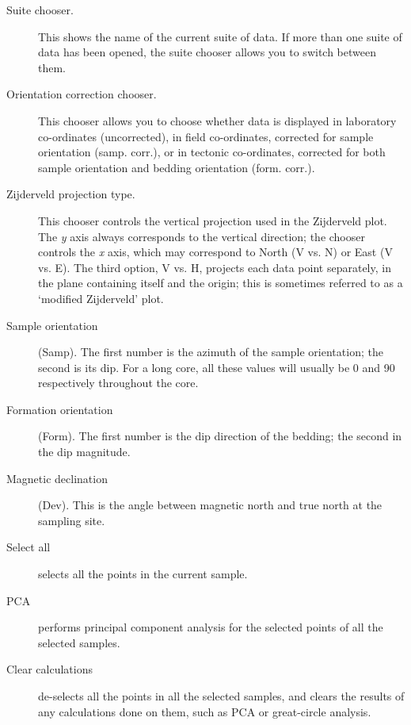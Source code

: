 \documentclass[a4paper,british]{article}
\newcommand{\ppcmd}[1]{\textsf{#1}} %
\newcommand{\caps}[1]{\MakeTextUppercase{#1}} %
\begin{document}
\begin{description}

\item[Suite chooser.] This shows the name of the current suite of
data. If more than one suite of data has been opened, the suite chooser
allows you to switch between them.

\item[Orientation correction chooser.] This chooser allows you to
choose whether data is displayed in laboratory co-ordinates
(\ppcmd{uncorrected}), in field co-ordinates, corrected for sample orientation
(\ppcmd{samp. corr.}), or in tectonic co-ordinates, corrected for both
sample orientation and bedding orientation (\ppcmd{form. corr.}).

\item[Zijderveld projection type.] This chooser controls the vertical
projection used in the Zijderveld plot. The {\em y} axis always corresponds
to the vertical direction; the chooser controls the {\em x} axis, which may
correspond to North (\ppcmd{V vs. N}) or East (\ppcmd{V vs. E}). The third
option, \ppcmd{V vs. H}, projects each data point separately, in the plane
containing itself and the origin; this is sometimes referred to as a
`modified Zijderveld' plot.

\item[Sample orientation] (\ppcmd{Samp}). The first number is the
azimuth of the sample orientation; the second is its dip. For a long core,
all these values will usually be 0 and 90 respectively throughout the core.

\item[Formation orientation] (\ppcmd{Form}). The first number is the
dip direction of the bedding; the second in the dip magnitude.

\item[Magnetic declination] (\ppcmd{Dev}). This is the angle between
magnetic north and true north at the sampling site.

\item[Select all] selects all the points in the current sample.

\item[\caps{Pca}] performs principal component analysis for the
selected points of all the selected samples.

\item[Clear calculations] de-selects all the points in all the
selected samples, and clears the results of any calculations done on them,
such as \caps{pca} or great-circle analysis.

\end{description}
\end{document}
